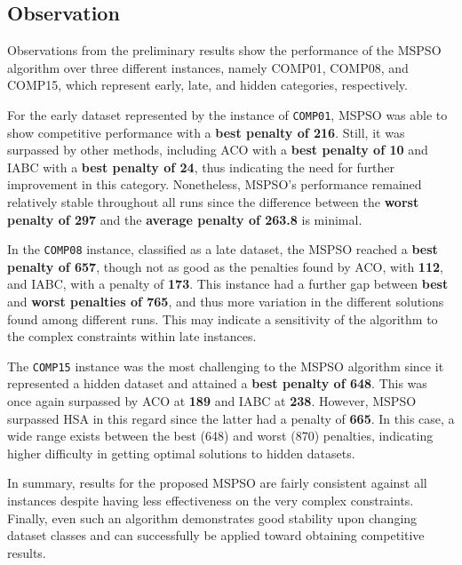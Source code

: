 \subsection{Observation}

Observations from the preliminary results show the performance of the MSPSO algorithm over three different instances, namely COMP01, COMP08, and COMP15, which represent early, late, and hidden categories, respectively.

For the early dataset represented by the instance of \texttt{COMP01}, MSPSO was able to show competitive performance with a \textbf{best penalty of 216}. Still, it was surpassed by other methods, including ACO with a \textbf{best penalty of 10} and IABC with a \textbf{best penalty of 24}, thus indicating the need for further improvement in this category. Nonetheless, MSPSO's performance remained relatively stable throughout all runs since the difference between the \textbf{worst penalty of 297} and the \textbf{average penalty of 263.8} is minimal.

In the \texttt{COMP08} instance, classified as a late dataset, the MSPSO reached a \textbf{best penalty of 657}, though not as good as the penalties found by ACO, with \textbf{112}, and IABC, with a penalty of \textbf{173}. This instance had a further gap between \textbf{best} and \textbf{worst penalties of 765}, and thus more variation in the different solutions found among different runs. This may indicate a sensitivity of the algorithm to the complex constraints within late instances.

The \texttt{COMP15} instance was the most challenging to the MSPSO algorithm since it represented a hidden dataset and attained a \textbf{best penalty of 648}. This was once again surpassed by ACO at \textbf{189} and IABC at \textbf{238}. However, MSPSO surpassed HSA in this regard since the latter had a penalty of \textbf{665}. In this case, a wide range exists between the best (648) and worst (870) penalties, indicating higher difficulty in getting optimal solutions to hidden datasets.

In summary, results for the proposed MSPSO are fairly consistent against all instances despite having less effectiveness on the very complex constraints. Finally, even such an algorithm demonstrates good stability upon changing dataset classes and can successfully be applied toward obtaining competitive results.

\break
